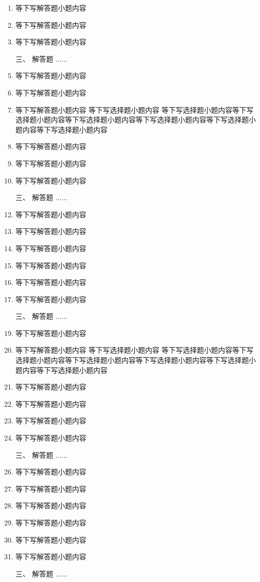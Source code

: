 \documentclass[12pt,twocolumn,landscape,UTF8,twoside]{ctexart}
\begin{document}
\begin{spacing}{1.3}
\begin{enumerate} [1、]
		\item 等下写解答题小题内容 
		\item 等下写解答题小题内容 
		\item 等下写解答题小题内容 
				\item[\heiti 三、] {\heiti 解答题  ......}
		\item 等下写解答题小题内容 
		\item 等下写解答题小题内容 
		\item 等下写解答题小题内容 等下写选择题小题内容 等下写选择题小题内容等下写选择题小题内容等下写选择题小题内容等下写选择题小题内容等下写选择题小题内容等下写选择题小题内容
		\item 等下写解答题小题内容 
		\item 等下写解答题小题内容 
		\item 等下写解答题小题内容 
				\item[\heiti 三、] {\heiti 解答题  ......}
		\item 等下写解答题小题内容 
		\item 等下写解答题小题内容 
		\item 等下写解答题小题内容 
		\item 等下写解答题小题内容 
		\item 等下写解答题小题内容 
		\item 等下写解答题小题内容 
				\item[\heiti 三、] {\heiti 解答题  ......}
		\item 等下写解答题小题内容 
		\item 等下写解答题小题内容 等下写选择题小题内容 等下写选择题小题内容等下写选择题小题内容等下写选择题小题内容等下写选择题小题内容等下写选择题小题内容等下写选择题小题内容
		\item 等下写解答题小题内容 
		\item 等下写解答题小题内容 
		\item 等下写解答题小题内容 
		\item 等下写解答题小题内容 
				\item[\heiti 三、] {\heiti 解答题  ......}
		\item 等下写解答题小题内容 
		\item 等下写解答题小题内容 
		\item 等下写解答题小题内容 
		\item 等下写解答题小题内容 
		\item 等下写解答题小题内容 
		\item 等下写解答题小题内容 		
		\item[\heiti 三、] {\heiti 解答题  ......}

\end{enumerate}
\end{spacing}
\end{document}
